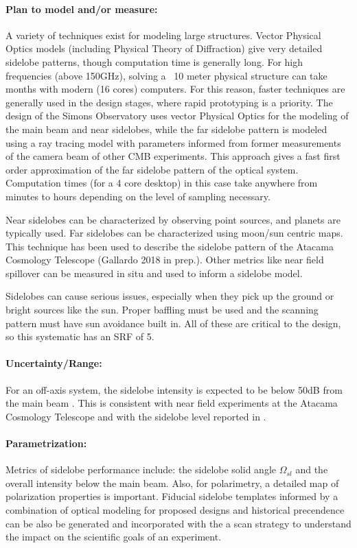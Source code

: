 \paragraph{Plan to model and/or measure:}

A variety of techniques exist for modeling large structures. Vector Physical Optics models (including Physical Theory of Diffraction) give very detailed sidelobe patterns, though computation time is generally long. For high frequencies (above 150GHz), solving a ~10 meter physical structure can take months with modern (16 cores) computers. For this reason, faster techniques are generally used in the design stages, where rapid prototyping is a priority. The design of the Simons Observatory uses vector Physical Optics for the modeling of the main beam and near sidelobes, while the far sidelobe pattern is modeled using a ray tracing model with parameters informed from former measurements of the camera beam of other CMB experiments. This approach gives a fast first order approximation of the far sidelobe pattern of the optical system. Computation times (for a 4 core desktop) in this case take anywhere from minutes to hours depending on the level of sampling necessary.

Near sidelobes can be characterized by observing point sources, and planets are typically used. Far sidelobes can be characterized using moon/sun centric maps. This technique has been used to describe the sidelobe pattern of the Atacama Cosmology Telescope (Gallardo 2018 in prep.). Other metrics like near field spillover can be measured in situ and used to inform a sidelobe model.

Sidelobes can cause serious issues, especially when they pick up the ground or bright sources like the sun. Proper baffling must be used and the scanning pattern must have sun avoidance built in. All of these are critical to the design, so this systematic has an SRF of 5.
\paragraph{Uncertainty/Range:}
For an off-axis system, the sidelobe intensity is expected to be below 50dB from the main beam \cite{lockman_stray_2002}. This is consistent with near field experiments at the Atacama Cosmology Telescope \cite{dunner_far_2012} and with the sidelobe level reported in \cite{naess_atacama_2014}.


\paragraph{Parametrization:} Metrics of sidelobe performance include: the sidelobe solid angle $\Omega_{sl}$ and the overall intensity below the main beam. Also, for polarimetry, a detailed map of polarization properties is important. Fiducial sidelobe templates informed by a combination of optical modeling for proposed designs and historical precendence can be also be generated and incorporated with the a scan strategy to understand the impact on the scientific goals of an experiment.

